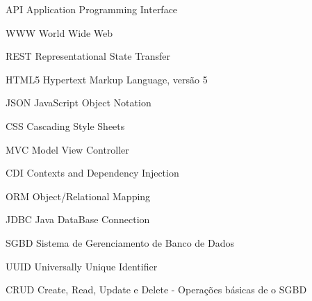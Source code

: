 \begin{siglas}
  \item[API] Application Programming Interface
  \item[WWW] World Wide Web
  \item[REST] Representational State Transfer
  \item[HTML5] Hypertext Markup Language, versão 5
  \item[JSON] JavaScript Object Notation
  \item[CSS] Cascading Style Sheets
  \item[MVC] Model View Controller
  \item[CDI] Contexts and Dependency Injection
  \item[ORM] Object/Relational Mapping
  \item[JDBC] Java DataBase Connection
  \item[SGBD] Sistema de Gerenciamento de Banco de Dados
  \item[UUID] Universally Unique Identifier
  \item[CRUD] Create, Read, Update e Delete - Operações básicas de o SGBD
\end{siglas}